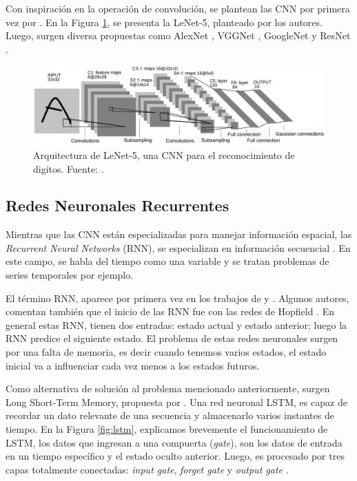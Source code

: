 Con inspiración en la operación de convolución, se plantean las CNN por primera vez por \cite{lecun1998gradient}. En la Figura \ref{fig:cnn3}, se presenta la LeNet-5, planteado por los autores. Luego, surgen diversa propuestas como AlexNet \citep{krizhevsky2012imagenet}, VGGNet \citep{simonyan2014very}, GoogleNet \citep{szegedy2015going} y ResNet \citep{he2016deep}.

\begin{figure}[H]
	\centering
	\includegraphics[width=\textwidth]{../img/neoantigen/cnn3}
	\caption{Arquitectura de LeNet-5, una CNN para el reconocimiento de digitos. Fuente: \cite{lecun1998gradient}.}
	\label{fig:cnn3}
\end{figure}


\subsection{Redes Neuronales Recurrentes}

Mientras que las CNN están especializadas para manejar información espacial, las \textit{Recurrent Neural Networks} (RNN), se especializan en información secuencial  \citep{zhang2021dive}. En este campo, se habla del tiempo como una variable y se tratan problemas de series temporales por ejemplo.

El término RNN, aparece por primera vez en los trabajos de \cite{rumelhart1985learning} y \cite{jordan1997serial}. Algunos autores, comentan también que el inicio de las RNN fue con las redes de Hopfield  \citep{hopfield1982neural}. En general estas RNN, tienen dos entradas: estado actual y estado anterior; luego la RNN predice el siguiente estado. El problema de estas redes neuronales surgen por una falta de memoria, es decir cuando tenemos varios estados, el estado inicial va a influenciar cada vez menos a los estados futuros.

Como alternativa de solución al problema mencionado anteriormente, surgen Long Short-Term Memory, propuesta por \cite{hochreiter1997long}. Una red neuronal LSTM, es capaz de recordar un dato relevante de una secuencia y almacenarlo varios instantes de tiempo. En la Figura \ref{fig:lstm}, explicamos brevemente el funcionamiento de LSTM, los datos que ingresan a una compuerta (\textit{gate}), son los datos de entrada en un tiempo específico y el estado oculto anterior. Luego, es procesado por tres capas totalmente conectadas: \textit{input gate}, \textit{forget gate} y \textit{output gate} \citep{zhang2021dive}.

